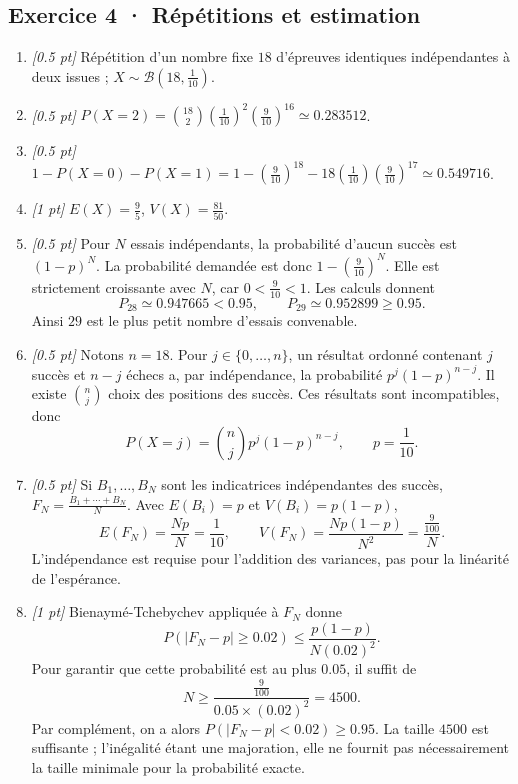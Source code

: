 \subsection*{Exercice 4 · Répétitions et estimation}\begin{enumerate}

\item \textit{[\num{0,5} pt]} Répétition d'un nombre fixe $18$ d'épreuves identiques indépendantes à deux issues ; $X\sim\mathcal B(18,\frac{1}{10})$.

\item \textit{[\num{0,5} pt]} $P(X=2)=\binom{18}2(\frac{1}{10})^2(\frac{9}{10})^{16}\simeq\num{0,283512}$.

\item \textit{[\num{0,5} pt]} $1-P(X=0)-P(X=1)=1-(\frac{9}{10})^{18}-18(\frac{1}{10})(\frac{9}{10})^{17}\simeq\num{0,549716}$.

\item \textit{[1 pt]} $E(X)=\frac{9}{5}$, $V(X)=\frac{81}{50}$.

\item \textit{[\num{0,5} pt]} Pour $N$ essais indépendants, la probabilité d'aucun succès est $(1-p)^N$. La probabilité demandée est donc $1-(\frac{9}{10})^N$. Elle est strictement croissante avec $N$, car $0<\frac{9}{10}<1$. Les calculs donnent
\[P_{28}\simeq\num{0,947665}<\num{0,95},\qquad P_{29}\simeq\num{0,952899}\ge\num{0,95}.\]
Ainsi $29$ est le plus petit nombre d'essais convenable.

\item \textit{[\num{0,5} pt]} Notons $n=18$. Pour $j\in\{0,\ldots,n\}$, un résultat ordonné contenant $j$ succès et $n-j$ échecs a, par indépendance, la probabilité $p^j(1-p)^{n-j}$. Il existe $\binom nj$ choix des positions des succès. Ces résultats sont incompatibles, donc
\[P(X=j)=\binom nj p^j(1-p)^{n-j},\qquad p=\frac{1}{10}.\]

\item \textit{[\num{0,5} pt]} Si $B_1,\ldots,B_N$ sont les indicatrices indépendantes des succès, $F_N=\frac{B_1+\cdots+B_N}{N}$. Avec $E(B_i)=p$ et $V(B_i)=p(1-p)$,
\[E(F_N)=\frac{Np}{N}=\frac{1}{10},\qquad V(F_N)=\frac{Np(1-p)}{N^2}=\frac{\frac{9}{100}}{N}.\]
L'indépendance est requise pour l'addition des variances, pas pour la linéarité de l'espérance.

\item \textit{[1 pt]} Bienaymé-Tchebychev appliquée à $F_N$ donne
\[P(|F_N-p|\ge\num{0,02})\le\frac{p(1-p)}{N(\num{0,02})^2}.\]
Pour garantir que cette probabilité est au plus $\num{0,05}$, il suffit de
\[N\ge\frac{\frac{9}{100}}{\num{0,05}\times(\num{0,02})^2}=4500.\]
Par complément, on a alors $P(|F_N-p|<\num{0,02})\ge\num{0,95}$. La taille $4500$ est suffisante ; l'inégalité étant une majoration, elle ne fournit pas nécessairement la taille minimale pour la probabilité exacte.

\end{enumerate}

